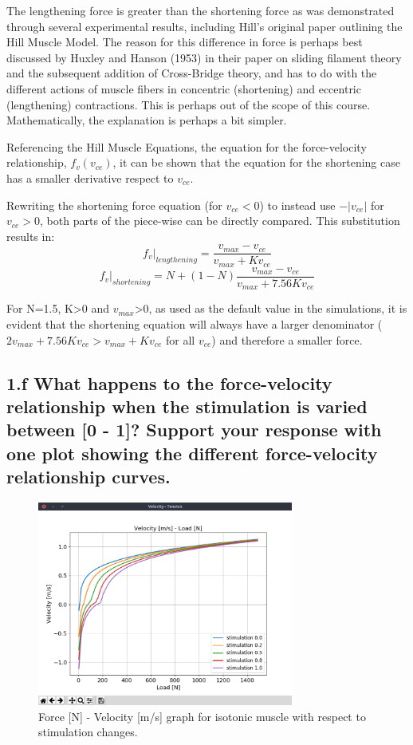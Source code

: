 \documentclass{cmc}
\begin{document}
The lengthening force is greater than the shortening force as was demonstrated through several experimental results, including Hill's original paper outlining the Hill Muscle Model. The reason for this difference in force is perhaps best discussed by Huxley and Hanson (1953) in their paper on sliding filament theory and the subsequent addition of Cross-Bridge theory, and has to do with the different actions of muscle fibers in concentric (shortening) and eccentric (lengthening) contractions. This is perhaps out of the scope of this course. Mathematically, the explanation is perhaps a bit simpler.

Referencing the Hill Muscle Equations, the equation for the force-velocity relationship, $f_v(v_{ce})$, it can be shown that the equation for the shortening case has a smaller derivative respect to $v_{ce}$. 

Rewriting the shortening force equation (for $v_{ce}<0$) to instead use $-|v_{ce}|$ for $v_{ce}>0$, both parts of the piece-wise can be directly compared. This substitution results in: 
\begin{equation} 
    f_v|_{lengthening}= \frac{v_{max}-v_{ce}}{v_{max}+Kv_{ce}}
\end{equation}
\begin{equation} 
    f_v|_{shortening}= N+(1-N)\frac{v_{max}-v_{ce}}{v_{max}+7.56Kv_{ce}}
\end{equation}

For N=1.5, K>0 and $v_{max}$>0, as used as the default value in the simulations, it is evident that the shortening equation will always have a larger denominator ($2v_{max}+7.56Kv_{ce}>v_{max}+Kv_{ce}$ for all $v_{ce}$) and therefore a smaller force. 

\subsection*{1.f What happens to the force-velocity relationship when the stimulation is varied between [0 - 1]? Support your response with one plot showing the different force-velocity relationship curves.}
  
\begin{figure}[H]
    \centering
    \includegraphics[width=0.75\textwidth,trim={0.5cm 1.25cm 1.5cm 1.5cm},clip]{1f/force_vce_stimulation.png}
    \caption{Force [N] - Velocity [m/s] graph for isotonic muscle with respect to stimulation changes.}
    \label{fig:isotonic_force_velocity}
\end{figure}
\end{document}
